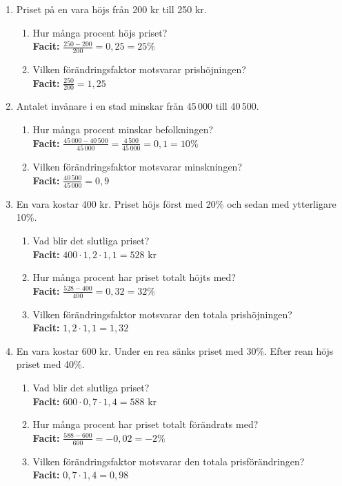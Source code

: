 \documentclass[a4paper,11pt]{article}
\begin{document}
\begin{enumerate}[label=\textbf{\arabic*.}]
    \item Priset på en vara höjs från 200 kr till 250 kr.
    \begin{enumerate}[label=\alph*)]
        \item Hur många procent höjs priset?
        \\ \textbf{Facit:} $\frac{250-200}{200} = 0,25 = 25\%$
        \item Vilken förändringsfaktor motsvarar prishöjningen?
        \\ \textbf{Facit:} $\frac{250}{200} = 1,25$
    \end{enumerate}
    
    \item Antalet invånare i en stad minskar från 45\,000 till 40\,500.
    \begin{enumerate}[label=\alph*)]
        \item Hur många procent minskar befolkningen?
        \\ \textbf{Facit:} $\frac{45\,000 - 40\,500}{45\,000} = \frac{4\,500}{45\,000} = 0,1 = 10\%$
        \item Vilken förändringsfaktor motsvarar minskningen?
        \\ \textbf{Facit:} $\frac{40\,500}{45\,000} = 0,9$
    \end{enumerate}
    
    \item En vara kostar 400 kr. Priset höjs först med 20\% och sedan med ytterligare 10\%.
    \begin{enumerate}[label=\alph*)]
        \item Vad blir det slutliga priset?
        \\ \textbf{Facit:} $400 \cdot 1,2 \cdot 1,1 = 528$ kr
        \item Hur många procent har priset totalt höjts med?
        \\ \textbf{Facit:} $\frac{528-400}{400} = 0,32 = 32\%$
        \item Vilken förändringsfaktor motsvarar den totala prishöjningen?
        \\ \textbf{Facit:} $1,2 \cdot 1,1 = 1,32$
    \end{enumerate}
    
    \item En vara kostar 600 kr. Under en rea sänks priset med 30\%. Efter rean höjs priset med 40\%.
    \begin{enumerate}[label=\alph*)]
        \item Vad blir det slutliga priset?
        \\ \textbf{Facit:} $600 \cdot 0,7 \cdot 1,4 = 588$ kr
        \item Hur många procent har priset totalt förändrats med?
        \\ \textbf{Facit:} $\frac{588-600}{600} = -0,02 = -2\%$
        \item Vilken förändringsfaktor motsvarar den totala prisförändringen?
        \\ \textbf{Facit:} $0,7 \cdot 1,4 = 0,98$
    \end{enumerate}
\end{enumerate}
\end{document}
